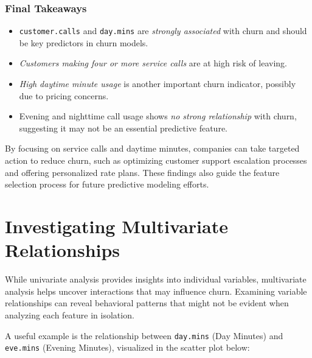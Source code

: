 \documentclass[
  11pt,
]{book}
\providecommand{\tightlist}{%
  \setlength{\itemsep}{0pt}\setlength{\parskip}{0pt}}
\theoremstyle{definition}
\theoremstyle{definition}
\theoremstyle{definition}
\theoremstyle{definition}
\theoremstyle{remark}
\begin{document}
\subsubsection*{Final Takeaways}\label{final-takeaways}


\begin{itemize}
\tightlist
\item
  \texttt{customer.calls} and \texttt{day.mins} are \emph{strongly associated} with churn and should be key predictors in churn models.\\
\item
  \emph{Customers making four or more service calls} are at high risk of leaving.\\
\item
  \emph{High daytime minute usage} is another important churn indicator, possibly due to pricing concerns.\\
\item
  Evening and nighttime call usage shows \emph{no strong relationship} with churn, suggesting it may not be an essential predictive feature.
\end{itemize}

By focusing on service calls and daytime minutes, companies can take targeted action to reduce churn, such as optimizing customer support escalation processes and offering personalized rate plans. These findings also guide the feature selection process for future predictive modeling efforts.

\section{Investigating Multivariate Relationships}\label{EDA-sec-multivariate}

While univariate analysis provides insights into individual variables, multivariate analysis helps uncover interactions that may influence churn. Examining variable relationships can reveal behavioral patterns that might not be evident when analyzing each feature in isolation.

A useful example is the relationship between \texttt{day.mins} (Day Minutes) and \texttt{eve.mins} (Evening Minutes), visualized in the scatter plot below:
\end{document}
